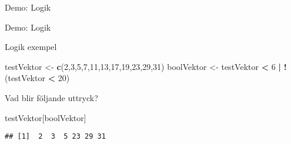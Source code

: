 \documentclass[
  10pt,
  ignorenonframetext,
]{beamer}
\newenvironment{Shaded}{\begin{snugshade}}{\end{snugshade}}
\newcommand{\DecValTok}[1]{\textcolor[rgb]{0.00,0.00,0.81}{#1}}
\newcommand{\FunctionTok}[1]{\textcolor[rgb]{0.13,0.29,0.53}{\textbf{#1}}}
\newcommand{\NormalTok}[1]{#1}
\newcommand{\OtherTok}[1]{\textcolor[rgb]{0.56,0.35,0.01}{#1}}
\newcommand{\SpecialCharTok}[1]{\textcolor[rgb]{0.81,0.36,0.00}{\textbf{#1}}}
\begin{document}
\begin{frame}{Demo: Logik}
\protect\hypertarget{demo-logik}{}
\begin{block}{Demo: Logik}
\protect\hypertarget{demo-logik-1}{}
\end{block}
\end{frame}

\begin{frame}[fragile]{Logik exempel}
\protect\hypertarget{logik-exempel}{}
\begin{Shaded}
\begin{Highlighting}[]
\NormalTok{testVektor }\OtherTok{\textless{}{-}} \FunctionTok{c}\NormalTok{(}\DecValTok{2}\NormalTok{,}\DecValTok{3}\NormalTok{,}\DecValTok{5}\NormalTok{,}\DecValTok{7}\NormalTok{,}\DecValTok{11}\NormalTok{,}\DecValTok{13}\NormalTok{,}\DecValTok{17}\NormalTok{,}\DecValTok{19}\NormalTok{,}\DecValTok{23}\NormalTok{,}\DecValTok{29}\NormalTok{,}\DecValTok{31}\NormalTok{)}
\NormalTok{boolVektor }\OtherTok{\textless{}{-}}\NormalTok{ testVektor }\SpecialCharTok{\textless{}} \DecValTok{6} \SpecialCharTok{|} \SpecialCharTok{!}\NormalTok{(testVektor }\SpecialCharTok{\textless{}} \DecValTok{20}\NormalTok{)}
\end{Highlighting}
\end{Shaded}

Vad blir följande uttryck?

\begin{Shaded}
\begin{Highlighting}[]
\NormalTok{testVektor[boolVektor]}
\end{Highlighting}
\end{Shaded}

\pause

\begin{verbatim}
## [1]  2  3  5 23 29 31
\end{verbatim}
\end{frame}
\end{document}
